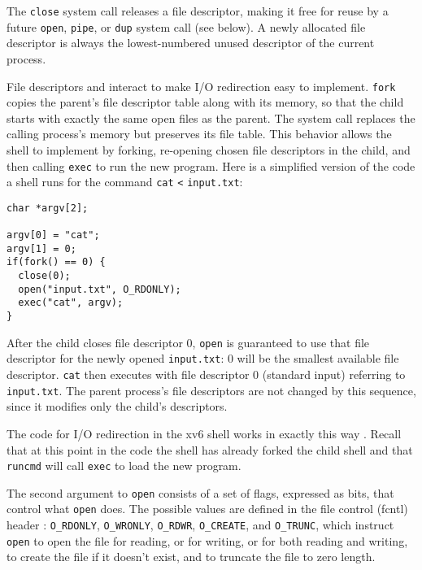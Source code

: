 The
\lstinline{close}
system call
releases a file descriptor, making it free for reuse by a future
\lstinline{open},
\lstinline{pipe},
or
\lstinline{dup}
system call (see below).
A newly allocated file descriptor 
is always the lowest-numbered unused
descriptor of the current process.

File descriptors and
interact to make I/O redirection easy to implement.
\lstinline{fork}
copies the parent's file descriptor table along with its memory,
so that the child starts with exactly the same open files as the parent.
The system call
replaces the calling process's memory but preserves its file table.
This behavior allows the shell to
implement  by forking,
re-opening chosen file descriptors in the child,
and then calling \lstinline{exec} to run the new program.
Here is a simplified version of the code a shell runs for the
command
\lstinline{cat}
\lstinline{<}
\lstinline{input.txt}:
\begin{lstlisting}[]
char *argv[2];

argv[0] = "cat";
argv[1] = 0;
if(fork() == 0) {
  close(0);
  open("input.txt", O_RDONLY);
  exec("cat", argv);
}
\end{lstlisting}
After the child closes file descriptor 0,
\lstinline{open}
is guaranteed to use that file descriptor
for the newly opened
\lstinline{input.txt}:
0 will be the smallest available file descriptor.
\lstinline{cat}
then executes with file descriptor 0 (standard input) referring to
\lstinline{input.txt}.
The parent process's file descriptors are not changed by this
sequence, since it modifies only the child's descriptors.

The code for I/O redirection in the xv6 shell works in exactly this way
.
Recall that at this point in the code the shell has already forked the
child shell and that 
\lstinline{runcmd} 
will call
\lstinline{exec}
to load the new program.

The second argument to \lstinline{open} consists of a set of
flags, expressed as bits, that control what \lstinline{open}
does. The possible values are defined in the file control (fcntl) header
:
\lstinline{O_RDONLY},
\lstinline{O_WRONLY},
\lstinline{O_RDWR},
\lstinline{O_CREATE}, and
\lstinline{O_TRUNC},
which instruct \lstinline{open} to
open the file for reading,
or for writing,
or for both reading and writing,
to create the file if it doesn't exist,
and to truncate the file to zero length.

